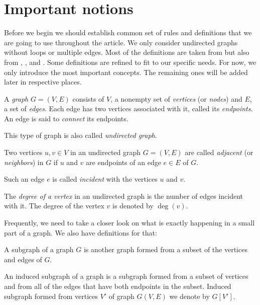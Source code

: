 \section{Important notions}

Before we begin we should establish common set of rules and definitions that we are going to use throughout the article. We only consider undirected graphs without loops or multiple edges. Most of the definitions are taken from \cite{blue_book} but also from \cite{bollobas1998modern}, \cite{butenko2003maximum}, \cite{cormen2022introduction} and \cite{wiki}. Some definitions are refined to fit to our specific needs. For now, we only introduce the most important concepts. The remaining ones will be added later in respective places.

\begin{defn}[graph]
A \emph{graph} $G = (V, E)$ consists of $V$, a nonempty set of \emph{vertices} (or \emph{nodes}) and $E$, a set of \emph{edges}. Each edge has two vertices associated with it, called its \emph{endpoints}. An edge is said to \emph{connect} its endpoints. 
\end{defn}
This type of graph is also called \emph{undirected graph}.

\begin{defn}
Two vertices $u,v\in V$ in an undirected graph $G=(V,E)$ are called \emph{adjacent} (or \emph{neighbors}) in $G$ if $u$ and $v$ are endpoints of an edge $e\in E$ of $G$. 

Such an edge $e$ is called \emph{incident} with the vertices $u$ and $v$.
\end{defn}

\begin{defn}
The \emph{degree of a vertex} in an undirected graph is the number of edges incident with it. The degree of the vertex $v$ is denoted by $\deg(v)$.
\end{defn}

Frequently, we need to take a closer look on what is exactly happening in a small part of a graph. We also have definitions for that:

\begin{defn}[subgraph]
A subgraph of a graph $G$ is another graph formed from a subset of the vertices and edges of $G$.
\end{defn}

\begin{defn}
An induced subgraph of a graph is a subgraph formed from a subset of vertices and from all of the edges that have both endpoints in the subset. Induced subgraph formed from vertices $V'$ of graph $G(V,E)$ we denote by $G[V']$.
\end{defn}

